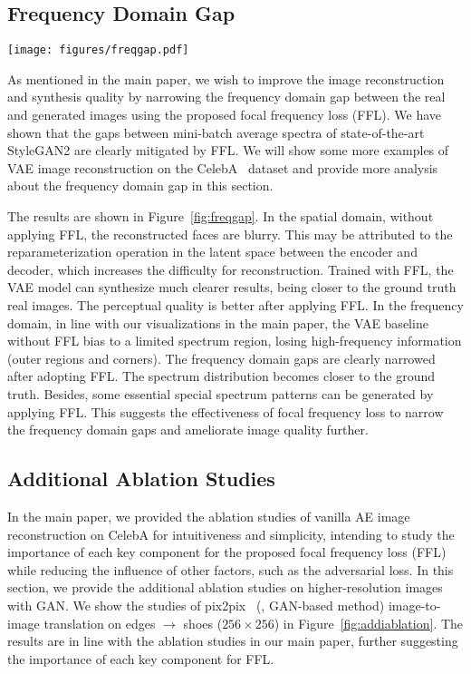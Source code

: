 \documentclass[10pt,twocolumn,letterpaper]{article}
\begin{document}
\subsection{Frequency Domain Gap}
\label{sec:freqgap}


\begin{figure*}[t]
	\centering
\texttt{[image: figures/freqgap.pdf]}
\caption{Frequency domain gaps are narrowed by the focal frequency loss (FFL) for VAE image reconstruction on CelebA.}
	\label{fig:freqgap}
\end{figure*}


As mentioned in the main paper, we wish to improve the image reconstruction and synthesis quality by narrowing the frequency domain gap between the real and generated images using the proposed focal frequency loss (FFL).
We have shown that the gaps between mini-batch average spectra of state-of-the-art StyleGAN2 are clearly mitigated by FFL.
We will show some more examples of VAE image reconstruction on the CelebA~\cite{celeba} dataset and provide more analysis about the frequency domain gap in this section.

The results are shown in Figure~\ref{fig:freqgap}.
In the spatial domain, without applying FFL, the reconstructed faces are blurry. This may be attributed to the reparameterization operation in the latent space between the encoder and decoder, which increases the difficulty for reconstruction.
Trained with FFL, the VAE model can synthesize much clearer results, being closer to the ground truth real images. The perceptual quality is better after applying FFL.
In the frequency domain, in line with our visualizations in the main paper, the VAE baseline without FFL bias to a limited spectrum region, losing high-frequency information (outer regions and corners).
The frequency domain gaps are clearly narrowed after adopting FFL. The spectrum distribution becomes closer to the ground truth. Besides, some essential special spectrum patterns can be generated by applying FFL.
This suggests the effectiveness of focal frequency loss to narrow the frequency domain gaps and ameliorate image quality further.


\subsection{Additional Ablation Studies}
\label{sec:addiablation}

In the main paper, we provided the ablation studies of vanilla AE image reconstruction on CelebA for intuitiveness and simplicity, intending to study the importance of each key component for the proposed focal frequency loss (FFL) while reducing the influence of other factors, such as the adversarial loss.
In this section, we provide the additional ablation studies on higher-resolution images with GAN. We show the studies of pix2pix~\cite{pix2pix} (\ie, GAN-based method) image-to-image translation on edges $\rightarrow$ shoes ($256 \times 256$) in Figure~\ref{fig:addiablation}. The results are in line with the ablation studies in our main paper, further suggesting the importance of each key component for FFL.
\end{document}
